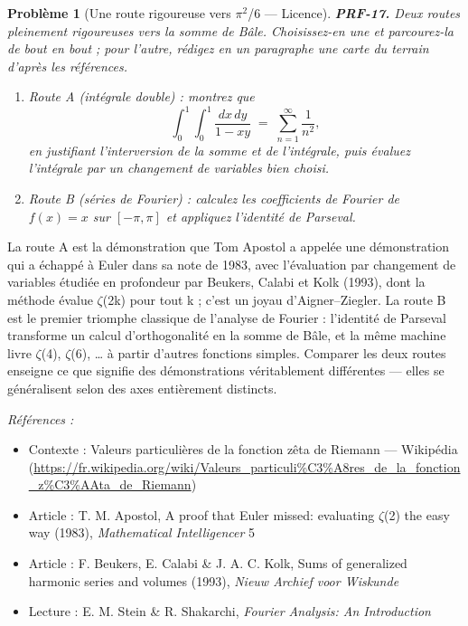 \documentclass[11pt]{article}
\newtheorem{problem}{Problème}
\newenvironment{refs}{\par\small\noindent\emph{Références :}\begin{itemize}\setlength\itemsep{0pt}}{\end{itemize}\normalsize}
\begin{document}
\bigskip

\begin{problem}[{Une route rigoureuse vers $\pi$$^2$/6 --- Licence}]
\textbf{PRF-17.} Deux routes pleinement rigoureuses vers la somme de Bâle. Choisissez-en
une et parcourez-la de bout en bout ; pour l'autre, rédigez en un paragraphe une carte du
terrain d'après les références.
\begin{enumerate}
\item[(a)] Route A (intégrale double) : montrez que
\[ \int_0^1 \!\! \int_0^1 \frac{dx\, dy}{1 - xy} \;=\; \sum_{n=1}^{\infty} \frac{1}{n^2}, \]
en justifiant l'interversion de la somme et de l'intégrale, puis évaluez l'intégrale par un
changement de variables bien choisi.
\item[(b)] Route B (séries de Fourier) : calculez les coefficients de Fourier de $ f(x) = x $
sur $ [-\pi, \pi] $ et appliquez l'identité de Parseval.
\end{enumerate}

\end{problem}

\noindent La route A est la démonstration que Tom Apostol a appelée \og{} une
démonstration qui a échappé à Euler \fg{} dans sa note de 1983, avec l'évaluation par changement
de variables étudiée en profondeur par Beukers, Calabi et Kolk (1993), dont la méthode évalue
$\zeta$(2k) pour tout k ; c'est un joyau d'Aigner--Ziegler. La route B est le premier triomphe
classique de l'analyse de Fourier : l'identité de Parseval transforme un calcul
d'orthogonalité en la somme de Bâle, et la même machine livre $\zeta$(4), $\zeta$(6), \dots{} à partir d'autres
fonctions simples. Comparer les deux routes enseigne ce que signifie \og{} des démonstrations
véritablement différentes \fg{} --- elles se généralisent selon des axes entièrement distincts.

\begin{refs}
\item Contexte : Valeurs particulières de la fonction zêta de Riemann --- Wikipédia (\url{https://fr.wikipedia.org/wiki/Valeurs_particuli%C3%A8res_de_la_fonction_z%C3%AAta_de_Riemann})
\item Article : T. M. Apostol, \og{} A proof that Euler missed: evaluating $\zeta$(2) the easy way \fg{} (1983), \textit{Mathematical Intelligencer} 5
\item Article : F. Beukers, E. Calabi \& J. A. C. Kolk, \og{} Sums of generalized harmonic series and volumes \fg{} (1993), \textit{Nieuw Archief voor Wiskunde}
\item Lecture : E. M. Stein \& R. Shakarchi, \textit{Fourier Analysis: An Introduction}
\end{refs}
\end{document}
